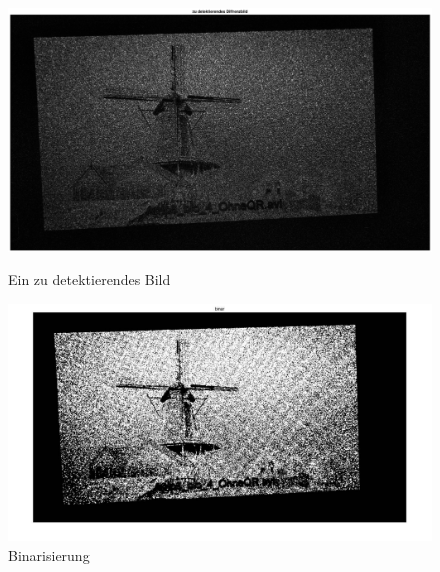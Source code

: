 \begin{figure}[H]
\centering 
\begin{minipage}[b]{0.49\textwidth} 
\centering 
\includegraphics[width=1.06\textwidth]{images/5_Implementirung/2/diff.eps} 
\caption{Ein zu detektierendes Bild}
\label{fig:diff2}
\end{minipage}
\begin{minipage}[b]{0.49\textwidth} 
\centering 
\includegraphics[width=1.0\textwidth]{images/5_Implementirung/2/bina.pdf}
\caption{Binarisierung}
\label{fig:binar2}
\end{minipage}
\end{figure}

